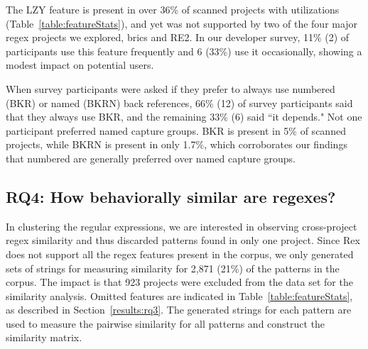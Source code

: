 The LZY feature  is present in over 36\% of scanned projects with utilizations (Table~\ref{table:featureStats}), and yet was not supported by two of the four major regex projects we explored, brics and RE2.
In our developer survey, 11\% (2) of participants use this feature frequently and 6 (33\%) use it occasionally, showing a modest impact on potential users.

When survey participants were asked if they prefer to always use numbered (BKR) or named (BKRN) back references, 66\% (12) of survey participants said that they always use BKR, and the remaining 33\% (6) said ``it depends."  Not one participant preferred named capture groups.  BKR is present in 5\% of scanned projects, while BKRN is present in only 1.7\%, which corroborates our findings that numbered  are generally preferred over named capture groups.

\subsection{RQ4: How behaviorally similar are regexes?}
\label{rq4:results}


In clustering the regular expressions, we are interested in observing cross-project regex similarity and thus discarded patterns found in only one project.
Since Rex does not support all the regex features present in the corpus, we only generated sets of strings for measuring similarity for 2,871 (21\%) of the  patterns in the corpus. The impact is that 923 projects were excluded from the data set for the similarity analysis. Omitted features are indicated in Table~\ref{table:featureStats}, as described in Section~\ref{results:rq3}.
The generated strings for each pattern are used to measure the pairwise similarity for all patterns and construct the similarity matrix.


